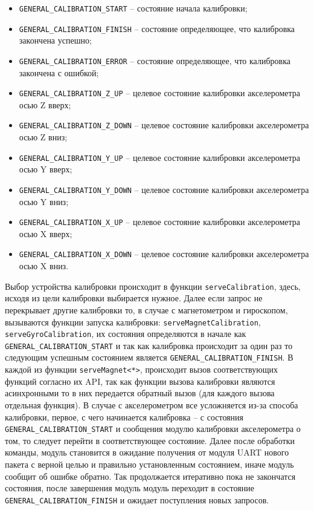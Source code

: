 \begin{itemize}
    \item \lstinline{GENERAL_CALIBRATION_START} -- состояние начала калибровки;
     \item \lstinline{GENERAL_CALIBRATION_FINISH} -- состояние определяющее, что калибровка закончена успешно;
     \item \lstinline{GENERAL_CALIBRATION_ERROR} -- состояние определяющее, что калибровка закончена с ошибкой;
     \item \lstinline{GENERAL_CALIBRATION_Z_UP} -- целевое состояние калибровки акселерометра осью Z вверх;
     \item \lstinline{GENERAL_CALIBRATION_Z_DOWN} -- целевое состояние калибровки акселерометра осью Z вниз; 
     \item \lstinline{GENERAL_CALIBRATION_Y_UP} -- целевое состояние калибровки акселерометра осью Y вверх; 
     \item \lstinline{GENERAL_CALIBRATION_Y_DOWN} -- целевое состояние калибровки акселерометра осью Y вниз; 
     \item \lstinline{GENERAL_CALIBRATION_X_UP} -- целевое состояние калибровки акселерометра осью X вверх; 
     \item \lstinline{GENERAL_CALIBRATION_X_DOWN} -- целевое состояние калибровки акселерометра осью X вниз.
\end{itemize}

Выбор устройства калибровки происходит в функции \lstinline{serveCalibration}, здесь, исходя из цели калибровки выбирается нужное. Далее если запрос не
перекрывает другие калибровки то, в случае с магнетометром и гироскопом, вызываются функции запуска калибровки: \lstinline{serveMagnetCalibration},
\lstinline{serveGyroCalibration}, их состояния определяются в начале как \lstinline{GENERAL_CALIBRATION_START} и так как калибровка происходит за один раз
то следующим успешным состоянием является \lstinline{GENERAL_CALIBRATION_FINISH}. В каждой из функции \lstinline{serveMagnet<*>}, происходит вызов соответствующих
функций согласно их API, так как функции вызова калибровки являются асинхронными то в них передается обратный вызов (для каждого вызова отдельная функция).
В случае с акселерометром все усложняется из-за способа калибровки, первое, с чего начинается калибровка -- с состояния \lstinline{GENERAL_CALIBRATION_START} и
сообщения модулю калибровки акселерометра о том, то следует перейти в соответствующее состояние. Далее после обработки команды, модуль становится в ожидание получения
от модуля UART нового пакета с верной целью и правильно установленным состоянием, иначе модуль сообщит об ошибке обратно. Так продолжается итеративно пока не закончатся
состояния, после завершения модуль модуль переходит в состояние \lstinline{GENERAL_CALIBRATION_FINISH} и ожидает поступления новых запросов.

